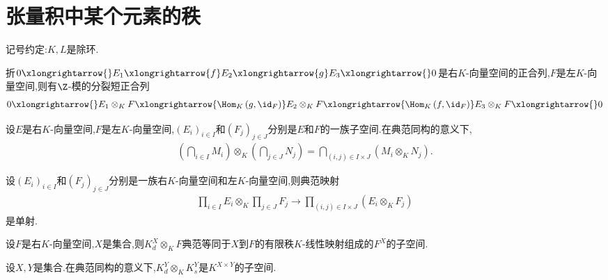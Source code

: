 \section{张量积中某个元素的秩}

记号约定:$K,L$是除环.

\begin{proposition}{}{}
	折$0\xlongrightarrow{}E_{1}\xlongrightarrow{f}E_{2}\xlongrightarrow{g}E_{3}\xlongrightarrow{}0$是右$K$-向量空间的正合列,$F$是左$K$-向量空间,则有$\Z$-模的分裂短正合列
	\begin{align*}
		0\xlongrightarrow{}E_{1}\otimes_{K}F\xlongrightarrow{\Hom_{K}\left(g,\id_{F}\right)}E_{2}\otimes_{K}F\xlongrightarrow{\Hom_{K}\left(f,\id_{F}\right)}E_{3}\otimes_{K}F\xlongrightarrow{}0
	\end{align*}
\end{proposition}

\begin{corollary}{}{}
	设$E$是右$K$-向量空间,$F$是左$K$-向量空间,$\left(E_{i}\right)_{i\in I}$和$\left(F_{j}\right)_{j\in J}$分别是$E$和$F$的一族子空间.在典范同构的意义下,
	\begin{align*}
		\left(\bigcap\limits_{i\in I}M_{i}\right)\otimes_{K}\left(\bigcap\limits_{j\in J}N_{j}\right)=\bigcap\limits_{\left(i,j\right)\in I\times J}\left(M_{i}\otimes_{K}N_{j}\right).
	\end{align*}
\end{corollary}

\begin{proposition}{}{}
	设$\left(E_{i}\right)_{i\in I}$和$\left(F_{j}\right)_{j\in J}$分别是一族右$K$-向量空间和左$K$-向量空间,则典范映射
	\begin{align*}
		\prod\limits_{i\in I}E_{i}\otimes_{K}\prod\limits_{j\in J}F_{j}\to\prod\limits_{\left(i,j\right)\in I\times J}\left(E_{i}\otimes_{K}F_{j}\right)
	\end{align*}
	是单射.
\end{proposition}

\begin{corollary}{}{}
	设$F$是右$K$-向量空间,$X$是集合,则$K_{d}^{X}\otimes_{K}F$典范等同于$X$到$F$的有限秩$K$-线性映射组成的$F^{X}$的子空间.
\end{corollary}

\begin{remark}{}{}
	设$X,Y$是集合.在典范同构的意义下,$K_{d}^{Y}\otimes_{K}K_{s}^{Y}$是$K^{X\times Y}$的子空间.
\end{remark}


